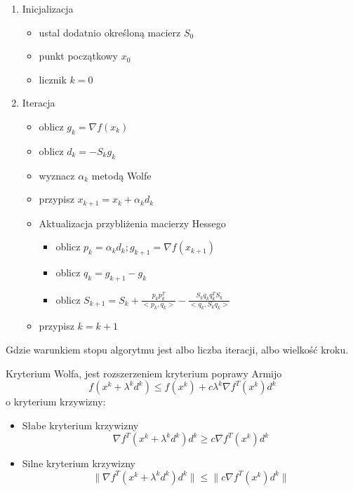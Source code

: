 \documentclass{classrep}
\begin{document}
\begin{enumerate}
\item Inicjalizacja
	\begin{itemize}
		\item ustal dodatnio określoną macierz $S_0$
		\item punkt początkowy $x_0$
		\item licznik $k=0$
	\end{itemize}
\item Iteracja
	\begin{itemize}
		\item oblicz $g_k = \nabla f(x_k)$
		\item oblicz $d_k = -S_k g_k$
		\item wyznacz $\alpha _k$ metodą Wolfe
		\item przypisz $x _{k+1} = x_k + \alpha _k d _k$
		\item Aktualizacja przybliżenia macierzy Hessego
		 \begin{itemize}
		 	\item oblicz $p_k = \alpha _k d _k ; g _{k+1} = \nabla f(x_{k+1})$
		 	\item oblicz $q_k = g_{k+1}-g_k$
		 	\item oblicz $S_{k+1}= S_{k} + \frac{p_{k}p_{k}^{T}}{< p_{k} , q_{k} >} - \frac{S_{k} q_{k} q_{k} ^{T} S_k }{< q_{k} , S_{k} q_{k}  >}$
		
		\end{itemize}
		\item przypisz $k=k+1$
	\end{itemize}
\end{enumerate}

Gdzie warunkiem stopu algorytmu jest albo liczba iteracji, albo wielkość kroku.

Kryterium Wolfa, jest rozszerzeniem kryterium poprawy Armijo
\begin{equation}
f( x^{k} + \lambda ^{k} d^{k} ) \leq f(x^{k}) + c \lambda ^{k} \nabla f^{T} (x ^{k} ) d^{k}
\end{equation}
 o kryterium krzywizny:
\begin{itemize}
\item Słabe kryterium krzywizny\\
	\begin{equation}
	\nabla f^{T} (x^{k} + \lambda ^{k} d^{k} ) d^{k} \geq c \nabla f^{T} (x ^{k} ) d^{k}
	\end{equation}
	
\item Silne kryterium krzywizny\\
	\begin{equation}
	\| \nabla f^{T} (x^{k} + \lambda ^{k} d^{k} ) d^{k} \| \leq \| c \nabla f^{T} (x ^{k} ) d^{k} \|
	\end{equation}

\end{itemize}
\end{document}
